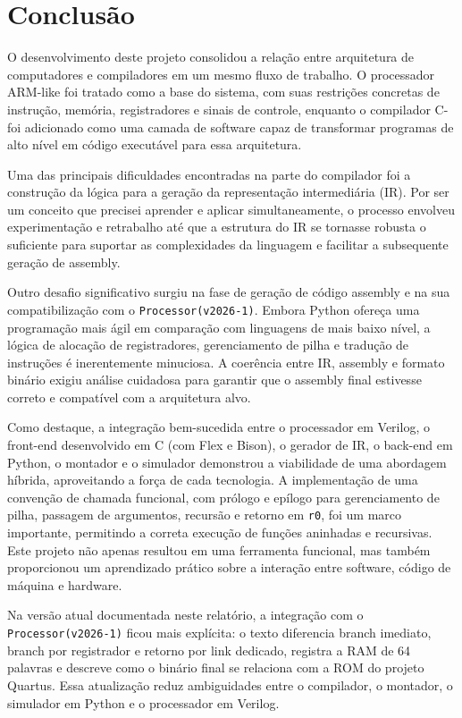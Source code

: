 \documentclass[
	12pt,				%
	oneside,
	a4paper,			%
	english,			%
	french,				%
	spanish,			%
	brazil,				%
	]{abntex2}
\begin{document}
\chapter{Conclusão}
\label{cap:conclusao}

O desenvolvimento deste projeto consolidou a relação entre arquitetura de computadores e compiladores em um mesmo fluxo de trabalho. O processador ARM-like foi tratado como a base do sistema, com suas restrições concretas de instrução, memória, registradores e sinais de controle, enquanto o compilador C- foi adicionado como uma camada de software capaz de transformar programas de alto nível em código executável para essa arquitetura.

Uma das principais dificuldades encontradas na parte do compilador foi a construção da lógica para a geração da representação intermediária (IR). Por ser um conceito que precisei aprender e aplicar simultaneamente, o processo envolveu experimentação e retrabalho até que a estrutura do IR se tornasse robusta o suficiente para suportar as complexidades da linguagem e facilitar a subsequente geração de assembly.

Outro desafio significativo surgiu na fase de geração de código assembly e na sua compatibilização com o \texttt{Processor(v2026-1)}. Embora Python ofereça uma programação mais ágil em comparação com linguagens de mais baixo nível, a lógica de alocação de registradores, gerenciamento de pilha e tradução de instruções é inerentemente minuciosa. A coerência entre IR, assembly e formato binário exigiu análise cuidadosa para garantir que o assembly final estivesse correto e compatível com a arquitetura alvo.

Como destaque, a integração bem-sucedida entre o processador em Verilog, o front-end desenvolvido em C (com Flex e Bison), o gerador de IR, o back-end em Python, o montador e o simulador demonstrou a viabilidade de uma abordagem híbrida, aproveitando a força de cada tecnologia. A implementação de uma convenção de chamada funcional, com prólogo e epílogo para gerenciamento de pilha, passagem de argumentos, recursão e retorno em \texttt{r0}, foi um marco importante, permitindo a correta execução de funções aninhadas e recursivas. Este projeto não apenas resultou em uma ferramenta funcional, mas também proporcionou um aprendizado prático sobre a interação entre software, código de máquina e hardware.

Na versão atual documentada neste relatório, a integração com o \texttt{Processor(v2026-1)} ficou mais explícita: o texto diferencia branch imediato, branch por registrador e retorno por link dedicado, registra a RAM de 64 palavras e descreve como o binário final se relaciona com a ROM do projeto Quartus. Essa atualização reduz ambiguidades entre o compilador, o montador, o simulador em Python e o processador em Verilog.
\end{document}
